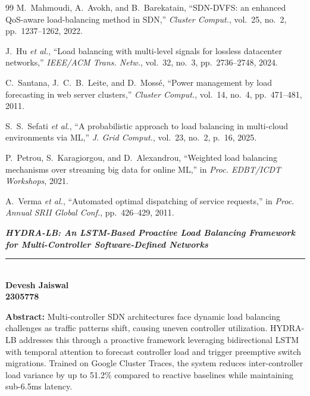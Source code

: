 \documentclass[12pt,a4paper]{report}
\newcommand{\ProjectTitle}{HYDRA-LB: An LSTM-Based Proactive Load Balancing Framework for Multi-Controller Software-Defined Networks}
\begin{document}
\begin{thebibliography}{99}
M.~Mahmoudi, A.~Avokh, and B.~Barekatain, ``SDN-DVFS: an enhanced QoS-aware load-balancing method in SDN,'' \textit{Cluster Comput.}, vol.~25, no.~2, pp.~1237--1262, 2022.

J.~Hu \textit{et al.}, ``Load balancing with multi-level signals for lossless datacenter networks,'' \textit{IEEE/ACM Trans. Netw.}, vol.~32, no.~3, pp.~2736--2748, 2024.

C.~Santana, J.~C.~B.~Leite, and D.~Moss\'{e}, ``Power management by load forecasting in web server clusters,'' \textit{Cluster Comput.}, vol.~14, no.~4, pp.~471--481, 2011.

S.~S.~Sefati \textit{et al.}, ``A probabilistic approach to load balancing in multi-cloud environments via ML,'' \textit{J. Grid Comput.}, vol.~23, no.~2, p.~16, 2025.

P.~Petrou, S.~Karagiorgou, and D.~Alexandrou, ``Weighted load balancing mechanisms over streaming big data for online ML,'' in \textit{Proc. EDBT/ICDT Workshops}, 2021.

A.~Verma \textit{et al.}, ``Automated optimal dispatching of service requests,'' in \textit{Proc. Annual SRII Global Conf.}, pp.~426--429, 2011.

\end{thebibliography}


\newpage
\thispagestyle{fancy}
\begin{center}
{\large \textbf{\textit{\ProjectTitle}}}\\
\rule{\textwidth}{0.4pt}\\[1cm]

{\Large \textbf{Devesh Jaiswal}}\\
{\large \textbf{2305778}}\\[0.8cm]
\end{center}

\noindent\textbf{Abstract:} Multi-controller SDN architectures face dynamic load balancing challenges as traffic patterns shift, causing uneven controller utilization. HYDRA-LB addresses this through a proactive framework leveraging bidirectional LSTM with temporal attention to forecast controller load and trigger preemptive switch migrations. Trained on Google Cluster Traces, the system reduces inter-controller load variance by up to 51.2\% compared to reactive baselines while maintaining sub-6.5ms latency.
\end{document}
